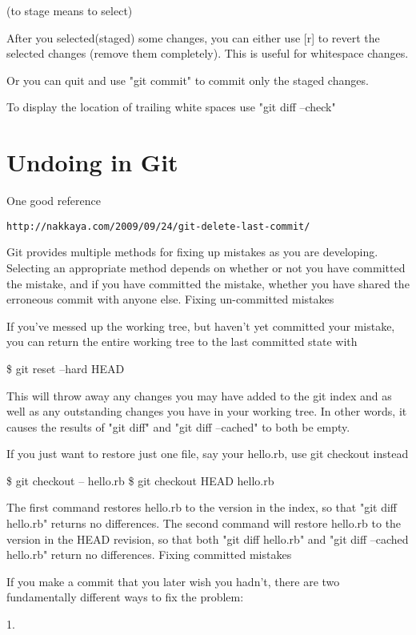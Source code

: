 \documentclass[a4paper,10pt]{article}
\begin{document}
    (to stage means to select)

    After you selected(staged) some changes, you can either use [r] to revert the selected changes (remove them completely). This is useful for whitespace changes.

    Or you can quit and use "git commit" to commit only the staged changes.

To display the location of trailing white spaces use "git diff --check"    

\section{Undoing in Git}

One good reference

\begin{verbatim}
http://nakkaya.com/2009/09/24/git-delete-last-commit/
\end{verbatim}
Git provides multiple methods for fixing up mistakes as you are developing. Selecting an appropriate method depends on whether or not you have committed the mistake, and if you have committed the mistake, whether you have shared the erroneous commit with anyone else.
Fixing un-committed mistakes

If you've messed up the working tree, but haven't yet committed your mistake, you can return the entire working tree to the last committed state with

\$ git reset --hard HEAD

This will throw away any changes you may have added to the git index and as well as any outstanding changes you have in your working tree. In other words, it causes the results of "git diff" and "git diff --cached" to both be empty.

If you just want to restore just one file, say your hello.rb, use git checkout instead

\$ git checkout -- hello.rb
\$ git checkout HEAD hello.rb

The first command restores hello.rb to the version in the index, so that "git diff hello.rb" returns no differences. The second command will restore hello.rb to the version in the HEAD revision, so that both "git diff hello.rb" and "git diff --cached hello.rb" return no differences.
Fixing committed mistakes

If you make a commit that you later wish you hadn't, there are two fundamentally different ways to fix the problem:

1.
\end{document}
